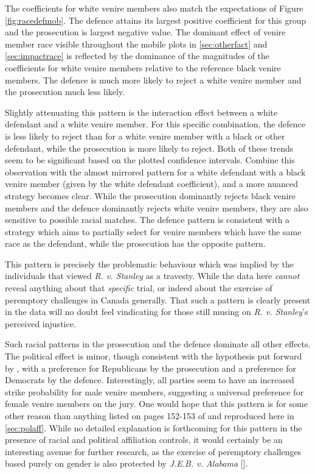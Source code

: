 The coefficients for white venire members also match the expectations of Figure \ref{fig:racedefmob}. The defence attains its
largest positive coefficient for this group and the prosecution is largest negative value. The dominant effect of venire member
race visible throughout the mobile plots in \ref{sec:otherfact} and \ref{sec:impactrace} is reflected by the dominance of the
magnitudes of the coefficients for white venire members relative to the reference black venire members. The defence is much more
likely to reject a white venire member and the prosecution much less likely.

Slightly attenuating this pattern is the interaction effect between a white defendant and a white venire member. For this specific
combination, the defence is less likely to reject than for a white venire member with a black or other defendant, while the
prosecution is more likely to reject. Both of these trends seem to be significant based on the plotted confidence
intervals. Combine this observation with the almost mirrored pattern for a white defendant with a black venire member (given by
the white defendant coefficient), and a more nuanced strategy becomes clear. While the prosecution dominantly rejects black venire
members and the defence dominantly rejects white venire members, they are also sensitive to possible racial matches. The defence
pattern is consistent with a strategy which aims to partially select for venire members which have the same race as the defendant,
while the prosecution has the opposite pattern.

This pattern is precisely the problematic behaviour which was implied by the individuals that viewed \textit{R. v. Stanley} as a
travesty. While the data here \textit{cannot} reveal anything about that \textit{specific} trial, or indeed about the exercise of
peremptory challenges in Canada generally. That such a pattern is clearly present in the data will no doubt feel vindicating for
those still musing on \textit{R. v. Stanley}'s perceived injustice.

Such racial patterns in the prosecution and the defence dominate all other effects. The political effect is minor, though
consistent with the hypothesis put forward by \cite{revesz2016}, with a preference for Republicans by the prosecution and a
preference for Democrats by the defence. Interestingly, all parties
seem to have an increased strike probability for male venire
members, suggesting a universal preference for female venire members on the jury. One would hope that this pattern is for some
other reason than anything listed on pages 152-153 of \cite{vandykejurysel} and reproduced here in \ref{sec:polaff}. While no
detailed explanation is forthcoming for this pattern in the presence of racial and political affiliation controls, it would
certainly be an interesting avenue for further research, as the exercise of peremptory challenges based purely on gender is also
protected by \textit{J.E.B. v. Alabama} [\cite{jebvalabama}].

